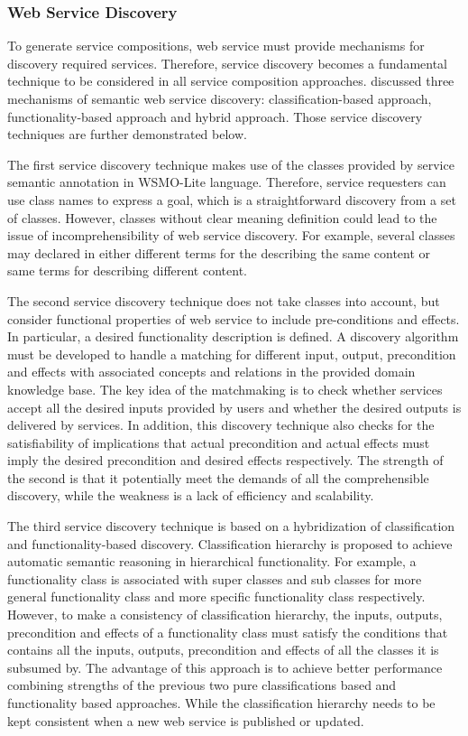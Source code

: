 \subsubsection{Web Service Discovery}\label{servicediscovery}
To generate service compositions, web service must provide mechanisms for discovery required services. Therefore, service discovery becomes a fundamental technique to be considered in all service composition approaches. \cite{agarwal2009d5} discussed three mechanisms of semantic web service discovery: classification-based approach, functionality-based approach and hybrid approach. Those service discovery techniques are further demonstrated below.

The first service discovery technique makes use of the classes provided by service semantic annotation in WSMO-Lite language. Therefore, service requesters can use class names to express a goal, which is a straightforward discovery from a set of classes. However, classes without clear meaning definition could lead to the issue of incomprehensibility of web service discovery. For example, several classes may declared in either different terms for the describing the same content or same terms for describing different content.

The second service discovery technique  does not take classes into account, but consider functional properties of web service to include pre-conditions and effects. In particular, a desired functionality description is defined. A discovery algorithm must be developed to handle a matching for different input, output, precondition and effects with associated concepts and relations in the provided domain knowledge base. The key idea of the matchmaking is to check whether services accept all the desired inputs provided by users and whether the desired outputs is delivered by services. In addition, this discovery technique also checks for the satisfiability of implications that actual precondition and actual effects must imply the desired precondition and desired effects respectively. The strength of the second is that it potentially meet the demands of all the comprehensible discovery, while the weakness is a lack of efficiency and scalability. 

The third service discovery technique is based on a hybridization of classification and functionality-based discovery. Classification hierarchy is proposed to achieve automatic semantic reasoning in hierarchical functionality. For example, a functionality class is associated with super classes and sub classes for more general functionality class and more specific functionality class respectively. However, to make a consistency of classification hierarchy, the inputs, outputs, precondition and effects of a functionality class must satisfy the conditions that contains all the inputs, outputs, precondition and effects of all the classes it is subsumed by. The advantage of this approach is to achieve better performance combining strengths of the previous two pure classifications based and functionality based approaches. While the classification hierarchy needs to be kept consistent when a new web service is published or updated.​

